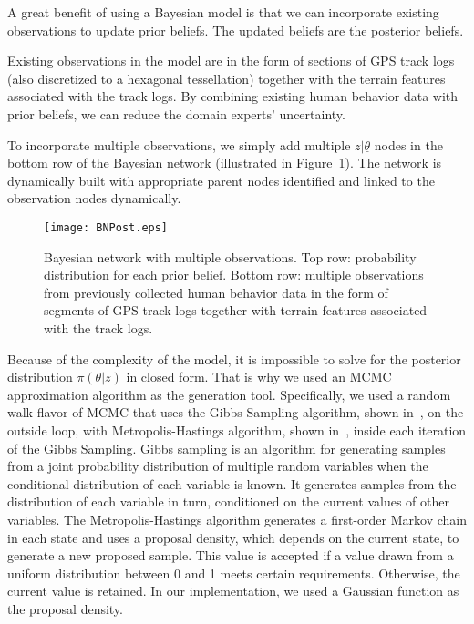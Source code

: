 A great benefit of using a Bayesian model is that we can incorporate existing observations to update prior beliefs. The updated beliefs are the posterior beliefs.

Existing observations in the model are in the form of sections of GPS track logs (also discretized to a hexagonal tessellation) together with the terrain features associated with the track logs. By combining existing human behavior data with prior beliefs, we can reduce the domain experts' uncertainty.

To incorporate multiple observations, we simply add multiple $z|\underline{\theta}$ nodes in the bottom row of the Bayesian network (illustrated in Figure~\ref{BNPost}). The network is dynamically built with appropriate parent nodes identified and linked to the observation nodes dynamically.
\begin{figure}
\centering
\texttt{[image: BNPost.eps]}
\caption[Bayesian network with multiple observations]{Bayesian network with multiple observations. Top row: probability distribution for each prior belief. Bottom row: multiple observations from previously collected human behavior data in the form of segments of GPS track logs together with terrain features associated with the track logs.}
\label{BNPost}
\end{figure}

Because of the complexity of the model, it is impossible to solve for the posterior distribution $\pi(\underline{\theta}|\underline{z})$ in closed form. That is why we used an MCMC approximation algorithm as the generation tool. Specifically, we used a random walk flavor of MCMC that uses the Gibbs Sampling algorithm, shown in~\cite{Gelman2004Bayesian}, on the outside loop, with Metropolis-Hastings algorithm, shown in~\cite{Gelman2004Bayesian}, inside each iteration of the Gibbs Sampling. Gibbs sampling is an algorithm for generating samples from a joint probability distribution of multiple random variables when the conditional distribution of each variable is known. It generates samples from the distribution of each variable in turn, conditioned on the current values of other variables. The Metropolis-Hastings algorithm generates a first-order Markov chain in each state and uses a proposal density, which depends on the current state, to generate a new proposed sample. This value is accepted if a value drawn from a uniform distribution between 0 and 1 meets certain requirements. Otherwise, the current value is retained. In our implementation, we used a Gaussian function as the proposal density.


